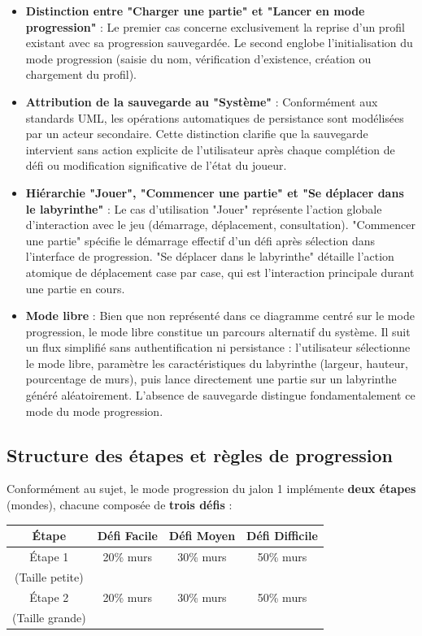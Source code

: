\documentclass{butexFR}
\begin{document}
\begin{itemize}
    \item \textbf{Distinction entre "Charger une partie" et "Lancer en mode progression"} : Le premier cas concerne exclusivement la reprise d'un profil existant avec sa progression sauvegardée. Le second englobe l'initialisation du mode progression (saisie du nom, vérification d'existence, création ou chargement du profil).

    \item \textbf{Attribution de la sauvegarde au "Système"} : Conformément aux standards UML, les opérations automatiques de persistance sont modélisées par un acteur secondaire. Cette distinction clarifie que la sauvegarde intervient sans action explicite de l'utilisateur après chaque complétion de défi ou modification significative de l'état du joueur.

    \item \textbf{Hiérarchie "Jouer", "Commencer une partie" et "Se déplacer dans le labyrinthe"} : Le cas d'utilisation "Jouer" représente l'action globale d'interaction avec le jeu (démarrage, déplacement, consultation). "Commencer une partie" spécifie le démarrage effectif d'un défi après sélection dans l'interface de progression. "Se déplacer dans le labyrinthe" détaille l'action atomique de déplacement case par case, qui est l'interaction principale durant une partie en cours.

    \item \textbf{Mode libre} : Bien que non représenté dans ce diagramme centré sur le mode progression, le mode libre constitue un parcours alternatif du système. Il suit un flux simplifié sans authentification ni persistance : l'utilisateur sélectionne le mode libre, paramètre les caractéristiques du labyrinthe (largeur, hauteur, pourcentage de murs), puis lance directement une partie sur un labyrinthe généré aléatoirement. L'absence de sauvegarde distingue fondamentalement ce mode du mode progression.
\end{itemize}

\subsection{Structure des étapes et règles de progression}

Conformément au sujet, le mode progression du jalon 1 implémente \textbf{deux étapes} (mondes), chacune composée de \textbf{trois défis} :

\begin{center}
\begin{tabular}{|c|c|c|c|}
\hline
\textbf{Étape} & \textbf{Défi Facile} & \textbf{Défi Moyen} & \textbf{Défi Difficile} \\
\hline
Étape 1 & 20\% murs & 30\% murs & 50\% murs \\
(Taille petite) & & & \\
\hline
Étape 2 & 20\% murs & 30\% murs & 50\% murs \\
(Taille grande) & & & \\
\hline
\end{tabular}
\end{center}
\end{document}
